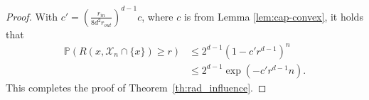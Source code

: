 \documentclass[10pt,a4paper]{amsart}
\def\P{{\mathds{P}}}
\def\cX{{\mathcal X}}
\begin{document}
\begin{proof}
With $c'=(\frac{r_{in}}{8 d^2 r_{out}})^{d-1}c$, where $c$ is from Lemma \ref{lem:cap-convex}, it holds that
\begin{align*}
\P( R(x, \cX_{n} \cap\{x\}) \geq r)
& \leq
2^{d-1} \left(1- c' r^{d-1} \right)^{n} 
\\ & \leq
2^{d-1} \exp(- c' r^{d-1} n).
\end{align*}
This completes the proof of Theorem~\ref{th:rad_influence}.
\end{proof}
\end{document}

